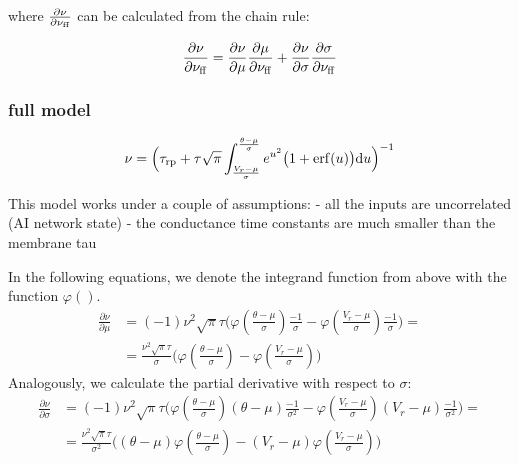 where $ \frac{\partial \nu}{\partial \nu_{\rm ff}}$ can be calculated from the chain rule:

\[
\frac{\partial \nu}{\partial \nu_{\rm ff}} = \frac{\partial \nu}{\partial \mu} \frac{\partial \mu}{\partial \nu_{\rm ff}} + 
\frac{\partial \nu}{\partial \sigma} \frac{\partial \sigma}{\partial \nu_{\rm ff}} 
\]



\subsubsection{full model}

\begin{equation}
  \nu = \Big(\tau_{\rm rp} + \tau \sqrt{\pi} \int_{\frac{V_r-\mu}{\sigma}}^{\frac{\theta-\mu}{\sigma}} e^{u^2} \big( 1+ {\rm erf}(u) \big) {\rm d}u \Big)^{-1}
  \label{eq:nn0}
\end{equation}


This model works under a couple of assumptions:
  - all the inputs are uncorrelated (AI network state)
  - the conductance time constants are much smaller than the membrane tau

  In the following equations, we denote the integrand function from above with the function $\varphi()$.
\begin{align}
 \frac{\partial \nu}{\partial \mu} &= 
  (-1) \nu^2 \sqrt{\pi} \tau \Bigg( \varphi \left(\frac{\theta-\mu}{\sigma}\right) \frac{-1}{\sigma} - \varphi\left(\frac{V_r-\mu}{\sigma}\right) \frac{-1}{\sigma}  \Bigg) = \\
  & = \frac{\nu^2 \sqrt{\pi} \tau}{\sigma} \Bigg( \varphi \left(\frac{\theta-\mu}{\sigma}\right)- \varphi\left(\frac{V_r-\mu}{\sigma}\right) \Bigg) 
\end{align}
  Analogously, we calculate the partial derivative with respect to $\sigma$:
\begin{align}
 \frac{\partial \nu}{\partial \sigma} &= 
  (-1) \nu^2 \sqrt{\pi} \tau \Bigg( \varphi \left(\frac{\theta-\mu}{\sigma}\right)(\theta- \mu)\frac{-1}{\sigma^2} - \varphi\left(\frac{V_r-\mu}{\sigma}\right)(V_r-\mu)\frac{-1}{\sigma^2}  \Bigg) = \\
  & = \frac{\nu^2 \sqrt{\pi} \tau}{\sigma^2} \Bigg( (\theta- \mu)\varphi \left(\frac{\theta-\mu}{\sigma}\right)- (V_r- \mu)\varphi\left(\frac{V_r-\mu}{\sigma}\right) \Bigg) 
\end{align}

